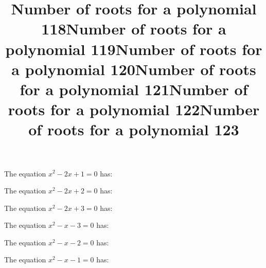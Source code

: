 \documentclass{article}
\begin{document}
\begin{category}
\begin{question}[multichoice]

\end{question}
\begin{question}[multichoice]
\title{Number of roots for a polynomial 118}
The equation $x^{2} - 2 x + 1=0$ has:


\end{question}
\begin{question}[multichoice]
\title{Number of roots for a polynomial 119}
The equation $x^{2} - 2 x + 2=0$ has:


\end{question}
\begin{question}[multichoice]
\title{Number of roots for a polynomial 120}
The equation $x^{2} - 2 x + 3=0$ has:


\end{question}
\begin{question}[multichoice]
\title{Number of roots for a polynomial 121}
The equation $x^{2} - x - 3=0$ has:


\end{question}
\begin{question}[multichoice]
\title{Number of roots for a polynomial 122}
The equation $x^{2} - x - 2=0$ has:


\end{question}
\begin{question}[multichoice]
\title{Number of roots for a polynomial 123}
The equation $x^{2} - x - 1=0$ has:



\end{question}
\end{category}
\end{document}
